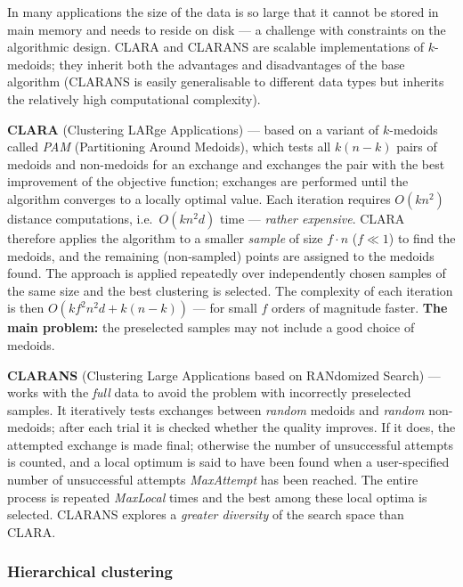 \documentclass[11pt,a4paper]{article}
\theoremstyle{definition}
\begin{document}
\begin{defbox}
In many applications the size of the data is so large that it cannot be stored in main memory and
needs to reside on disk --- a challenge with constraints on the algorithmic design. CLARA and
CLARANS are scalable implementations of $k$-medoids; they inherit both the advantages and
disadvantages of the base algorithm (CLARANS is easily generalisable to different data types but
inherits the relatively high computational complexity).

\textbf{CLARA} (Clustering LARge Applications) --- based on a variant of $k$-medoids called
\emph{PAM} (Partitioning Around Medoids), which tests all $k(n-k)$ pairs of medoids and non-medoids
for an exchange and exchanges the pair with the best improvement of the objective function;
exchanges are performed until the algorithm converges to a locally optimal value. Each iteration
requires $O(kn^2)$ distance computations, i.e.\ $O(kn^2d)$ time --- \emph{rather expensive}. CLARA
therefore applies the algorithm to a smaller \emph{sample} of size $f\cdot n$ ($f\ll 1$) to find
the medoids, and the remaining (non-sampled) points are assigned to the medoids found. The approach
is applied repeatedly over independently chosen samples of the same size and the best clustering is
selected. The complexity of each iteration is then $O(kf^2n^2d+k(n-k))$ --- for small $f$ orders of
magnitude faster. \textbf{The main problem:} the preselected samples may not include a good choice
of medoids.

\textbf{CLARANS} (Clustering Large Applications based on RANdomized Search) --- works with the
\emph{full} data to avoid the problem with incorrectly preselected samples. It iteratively tests
exchanges between \emph{random} medoids and \emph{random} non-medoids; after each trial it is
checked whether the quality improves. If it does, the attempted exchange is made final; otherwise
the number of unsuccessful attempts is counted, and a local optimum is said to have been found when
a user-specified number of unsuccessful attempts \emph{MaxAttempt} has been reached. The entire
process is repeated \emph{MaxLocal} times and the best among these local optima is selected.
CLARANS explores a \emph{greater diversity} of the search space than CLARA.
\end{defbox}

\subsubsection{Hierarchical clustering}
\end{document}
